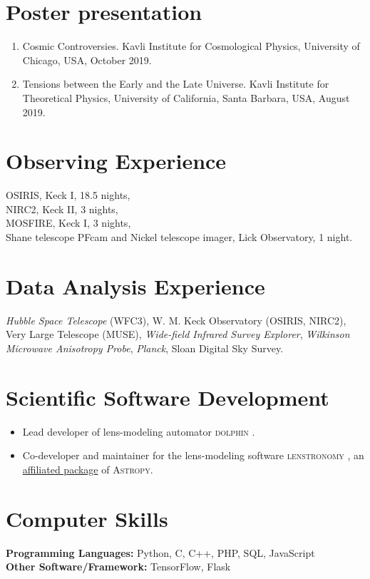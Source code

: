 \documentclass[margin, line]{res}
\newenvironment{list2}{
  \begin{list}{$\bullet$}{%
      \setlength{\itemsep}{0in}
      \setlength{\parsep}{0in} \setlength{\parskip}{0in}
      \setlength{\topsep}{0in} \setlength{\partopsep}{0in} 
      \setlength{\leftmargin}{0.2in}}}{\end{list}}
\begin{document}
\begin{resume}
\section{\sc Poster presentation}
\begin{enumerate}
	\item Cosmic Controversies. Kavli Institute for Cosmological Physics, University of Chicago, USA, October 2019.
	\item Tensions between the Early and the Late Universe. Kavli Institute for Theoretical Physics, University of California, Santa Barbara, USA, August 2019.
\end{enumerate}


\section{\sc Observing Experience}
OSIRIS, Keck I, 18.5 nights,\\
NIRC2, Keck II, 3 nights, \\
MOSFIRE, Keck I, 3 nights, \\
Shane telescope PFcam and Nickel telescope imager, Lick Observatory, 1 night.


\section{\sc Data Analysis Experience}
\textit{Hubble Space Telescope} (WFC3), 
W. M. Keck Observatory (OSIRIS, NIRC2),
Very Large Telescope (MUSE),
{\it Wide-field Infrared Survey Explorer},
{\it Wilkinson Microwave Anisotropy Probe},
{\it Planck},
Sloan Digital Sky Survey.

\section{\sc Scientific Software Development} 
\begin{itemize}
	\item Lead developer of lens-modeling automator \textsc{dolphin} \href{https://github.com/ajshajib/dolphin}{\faGithub}.
	\item Co-developer and maintainer for the lens-modeling software \textsc{lenstronomy} \href{https://github.com/lenstronomy/lenstronomy}{\faGithub}, an \href{https://www.astropy.org/affiliated/index.html}{affiliated package} of \textsc{Astropy}.
\end{itemize}

\section{\sc Computer Skills} 
\textbf{Programming Languages:} Python, C, C++, PHP, SQL, JavaScript \\
\textbf{Other Software/Framework:} TensorFlow, Flask



\end{resume}
\end{document}
